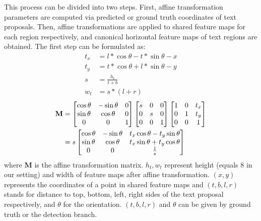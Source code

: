 \documentclass[10pt,twocolumn,letterpaper]{article}
\begin{document}
This process can be divided into two steps. First, affine transformation parameters are computed via predicted or ground truth coordinates of text proposals. Then, affine transformations are applied to shared feature maps for each region respectively, and canonical horizontal feature maps of text regions are obtained. The first step can be formulated as:
{
\setlength\abovedisplayskip{0pt}
\setlength\belowdisplayskip{0pt}
\begin{align}
t_x &= l * \cos \theta - t *  \sin \theta - x \\
t_y &= t * \cos \theta + l *  \sin \theta - y \\
s &= \frac{h_t}{t+b} \\
w_t &= s * (l+r)
\end{align}
}
{
\setlength\abovedisplayskip{0pt}
\setlength\belowdisplayskip{1em}
\begin{align}
\mathbf{M} &= \begin{bmatrix}
\cos\theta & -\sin \theta & 0 \\ \sin \theta & \cos \theta &0 \\ 0 & 0 & 1
\end{bmatrix}\begin{bmatrix}
s & 0 & 0 \\ 0 & s & 0 \\ 0 & 0 & 1
\end{bmatrix}
\begin{bmatrix}
1 & 0 & t_x \\ 0 & 1 & t_y \\ 0 & 0 & 1
\end{bmatrix} \notag \\
&= s \begin{bmatrix}
\cos \theta & -\sin \theta & t_x \cos \theta - t_y \sin \theta \\
\sin \theta & \cos \theta & t_x \sin \theta + t_y \cos \theta \\
0 & 0 & \frac{1}{s}
\end{bmatrix}
\end{align}
}
\newline
where $\mathbf{M}$ is the affine transformation matrix. $h_t, w_t$ represent height (equals 8 in our setting) and width of feature maps after affine transformation. $(x, y)$ represents the coordinates of a point in shared feature maps and $(t, b, l, r)$ stands for distance to top, bottom, left, right sides of the text proposal respectively, and $\theta$ for the orientation. $(t, b, l, r)$ and $\theta$ can be given by ground truth or the detection branch.
\end{document}
